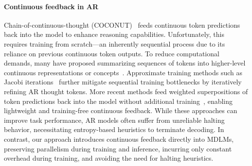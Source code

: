 \documentclass{article}
\begin{document}
\paragraph{Continuous feedback in AR}
%
Chain-of-continuous-thought (COCONUT)~\citep{hao_training_2024} feeds continuous token predictions back into the model to enhance reasoning capabilities.
%
Unfortunately, this requires training from scratch---an inherently sequential process due to its reliance on previous continuous token outputs.
%
To reduce computational demands, many have proposed summarizing sequences of tokens into higher-level continuous representations or concepts~\citep{lcm_large_2024, tack_llm_2025, geiping_scaling_2025}.
% 
Approximate training methods such as Jacobi iterations~\citep{wu_parallel_2025} further mitigate sequential training bottlenecks by iteratively refining AR thought tokens.
%
More recent methods feed weighted superpositions of token predictions back into the model without additional training~\citep{zhuang_text_2025, zhang_soft_2025}, enabling lightweight and training-free continuous feedback.
%
While these approaches can improve task performance, AR models often suffer from unreliable halting behavior, necessitating entropy-based heuristics to terminate decoding.
% 
In contrast, our approach introduces continuous feedback directly into MDLMs, preserving parallelism during training and inference, incurring only constant overhead during training, and avoiding the need for halting heuristics.
\end{document}

